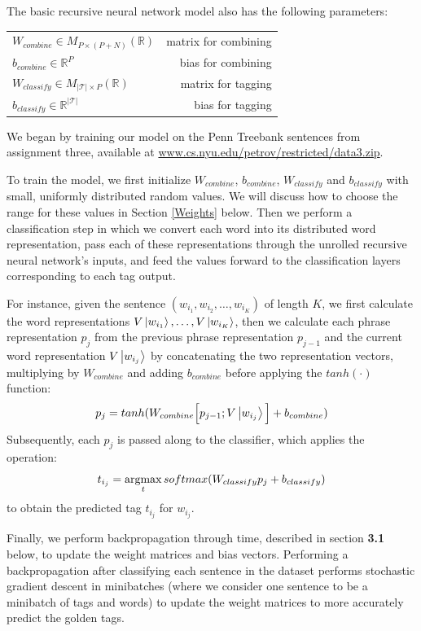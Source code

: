 \documentclass[11pt]{article}
\newcommand{\argmax}{\operatornamewithlimits{argmax}}
\begin{document}
The basic recursive neural network model also has the following parameters:

\begin{center}
\begin{tabular}{ l r }
  $W_{combine}\in M_{P\times(P+N)}(\mathbb{R})$ & matrix for combining \\
  $b_{combine}\in \mathbb{R}^P$ & bias for combining \\
  $W_{classify}\in M_{\left\vert\mathcal{T}\right\vert\times P}(\mathbb{R})$ & matrix for tagging \\
  $b_{classify}\in \mathbb{R}^{\left\vert\mathcal{T}\right\vert}$ & bias for tagging \\
\end{tabular}
\end{center}

\vspace{5mm}
We began by training our model on the Penn Treebank sentences from assignment three, available at \hyperlink{http://www.cs.nyu.edu/petrov/restricted/data3.zip}{www.cs.nyu.edu/petrov/restricted/data3.zip}.

To train the model, we first initialize $W_{combine}$, $b_{combine}$, $W_{classify}$ and $b_{classify}$ with small, uniformly distributed random values. We will discuss how to choose the range for these values in Section \ref{Weights} below. Then we perform a classification step in which we convert each word into its distributed word representation, pass each of these representations through the unrolled recursive neural network's inputs, and feed the values forward to the classification layers corresponding to each tag output.

For instance, given the sentence $(w_{i_1},w_{i_2},\ldots,w_{i_K})$ of length $K$, we first calculate the word representations $V\Ket{w_{i_1}},\ldots,V\Ket{w_{i_K}}$, then we calculate each phrase representation $p_j$ from the previous phrase representation $p_{j-1}$ and the current word representation $V\Ket{w_{i_j}}$ by concatenating the two representation vectors, multiplying by $W_{combine}$ and adding $b_{combine}$ before applying the $tanh(\cdot)$ function:
$$p_j = tanh(W_{combine}\Big[p_{j-1};V\Ket{w_{i_j}}\Big] + b_{combine})$$
Subsequently, each $p_j$ is passed along to the classifier, which applies the operation:
$$t_{i_j} = \argmax\limits_{t} softmax(W_{classify}p_j + b_{classify})$$
to obtain the predicted tag $t_{i_j}$ for $w_{i_j}$.

Finally, we perform backpropagation through time, described in section \textbf{3.1} below, to update the weight matrices and bias vectors. Performing a backpropagation after classifying each sentence in the dataset performs stochastic gradient descent in minibatches (where we consider one sentence to be a minibatch of tags and words) to update the weight matrices to more accurately predict the golden tags.
\end{document}
